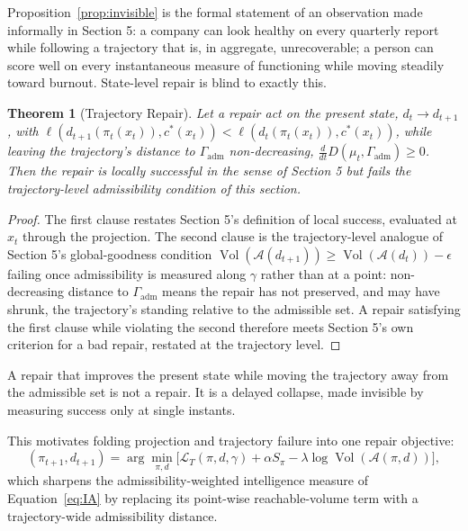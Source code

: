 \documentclass[11pt]{article}
\theoremstyle{plain}
\newtheorem{theorem}{Theorem}[section]
\theoremstyle{definition}
\theoremstyle{remark}
\begin{document}
Proposition~\ref{prop:invisible} is the formal statement of an observation made informally in Section 5: a company can look healthy on every quarterly report while following a trajectory that is, in aggregate, unrecoverable; a person can score well on every instantaneous measure of functioning while moving steadily toward burnout. State-level repair is blind to exactly this.

\begin{theorem}[Trajectory Repair]
\label{thm:trajectory}
Let a repair act on the present state, $d_t \to d_{t+1}$, with $\ell(d_{t+1}(\pi_t(x_t)), c^\ast(x_t)) < \ell(d_t(\pi_t(x_t)), c^\ast(x_t))$, while leaving the trajectory's distance to $\Gamma_{\mathrm{adm}}$ non-decreasing, $\frac{d}{dt}D(\mu_t,\Gamma_{\mathrm{adm}}) \ge 0$. Then the repair is locally successful in the sense of Section 5 but fails the trajectory-level admissibility condition of this section.
\end{theorem}
\begin{proof}
The first clause restates Section 5's definition of local success, evaluated at $x_t$ through the projection. The second clause is the trajectory-level analogue of Section 5's global-goodness condition $\operatorname{Vol}(\mathcal{A}(d_{t+1})) \ge \operatorname{Vol}(\mathcal{A}(d_t)) - \epsilon$ failing once admissibility is measured along $\gamma$ rather than at a point: non-decreasing distance to $\Gamma_{\mathrm{adm}}$ means the repair has not preserved, and may have shrunk, the trajectory's standing relative to the admissible set. A repair satisfying the first clause while violating the second therefore meets Section 5's own criterion for a bad repair, restated at the trajectory level.
\end{proof}

\begin{tcolorbox}[title=Trajectory Repair Theorem]
A repair that improves the present state while moving the trajectory away from the admissible set is not a repair. It is a delayed collapse, made invisible by measuring success only at single instants.
\end{tcolorbox}

This motivates folding projection and trajectory failure into one repair objective:
\[
(\pi_{t+1}, d_{t+1}) = \arg\min_{\pi,d}\Big[\mathcal{L}_T(\pi,d,\gamma) + \alpha S_\pi - \lambda \log \operatorname{Vol}(\mathcal{A}(\pi,d))\Big],
\]
which sharpens the admissibility-weighted intelligence measure of Equation~\eqref{eq:IA} by replacing its point-wise reachable-volume term with a trajectory-wide admissibility distance.
\end{document}

